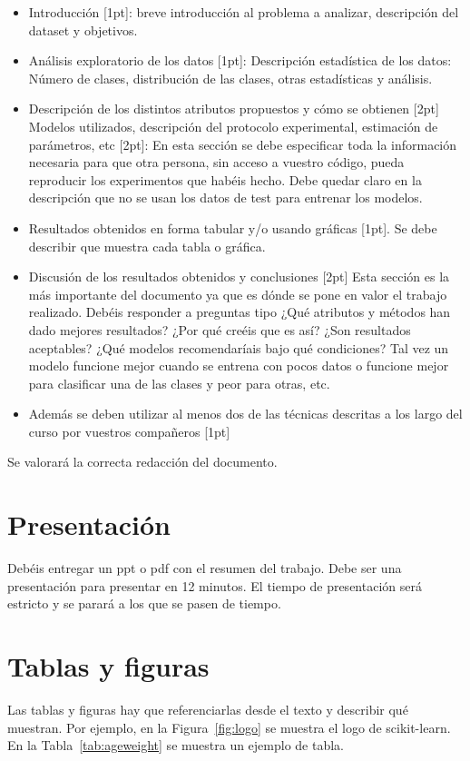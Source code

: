 \documentclass{esannV2}
\begin{document}
\begin{itemize}
\item Introducción [1pt]: breve introducción al problema a analizar, descripción del dataset y objetivos.
\item Análisis exploratorio de los datos [1pt]: Descripción estadística de los datos: Número de clases, distribución de las clases, otras estadísticas y análisis.
\item Descripción de los distintos atributos  propuestos y cómo se obtienen [2pt]
Modelos utilizados, descripción del protocolo experimental, estimación de parámetros, etc [2pt]: En esta sección se debe especificar toda la información necesaria para que otra persona, sin acceso a vuestro código, pueda reproducir los experimentos que habéis hecho. Debe quedar claro en la descripción que no se usan los datos de test para entrenar los modelos.
\item Resultados obtenidos en forma tabular y/o usando gráficas [1pt]. Se debe describir que muestra cada tabla o gráfica.
\item Discusión de los resultados obtenidos y conclusiones [2pt] Esta sección es la más importante del documento ya que es dónde se pone en valor el trabajo realizado. Debéis responder a preguntas  tipo ¿Qué atributos y métodos han dado mejores resultados? ¿Por qué creéis que es así? ¿Son resultados aceptables? ¿Qué modelos recomendaríais bajo qué condiciones? Tal vez un modelo funcione mejor cuando se entrena con pocos datos o funcione mejor para clasificar una de las clases y peor para otras, etc.
\item Además se deben utilizar al menos dos de las técnicas descritas a los largo del curso por vuestros compañeros [1pt]
\end{itemize}

Se valorará la correcta redacción del documento.

\section{Presentación}
Debéis entregar un ppt o pdf con el resumen del trabajo. Debe ser una
presentación para presentar en 12 minutos. El tiempo de presentación será
estricto y se parará a los que se pasen de tiempo.

\section{Tablas y figuras}
Las tablas y figuras hay que referenciarlas desde el texto y describir qué
muestran. Por ejemplo, en la Figura~\ref{fig:logo} se muestra el logo de
scikit-learn. En la Tabla~\ref{tab:ageweight} se muestra un ejemplo de tabla.
\end{document}
